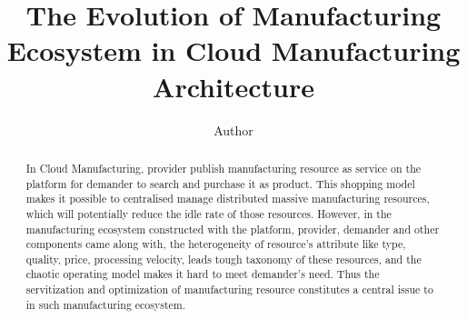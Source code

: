 
\title{The Evolution of Manufacturing Ecosystem in Cloud Manufacturing Architecture
}

\author[label1]{Author}
\address[label1]{ZJU}
\begin{abstract}
In Cloud Manufacturing, provider publish manufacturing resource as service on the platform for demander to search and purchase it as product. This shopping model makes it possible to centralised manage distributed massive manufacturing resources, which will potentially reduce the idle rate of those resources.
However, in the manufacturing ecosystem constructed with the platform, provider, demander and other components came along with, the heterogeneity of resource's attribute like type, quality, price, processing velocity, leads tough taxonomy of these resources, and the chaotic operating model makes it hard to meet demander's need.
Thus the servitization and optimization of manufacturing resource constitutes a central issue to  in such manufacturing ecosystem.













\end{abstract}
